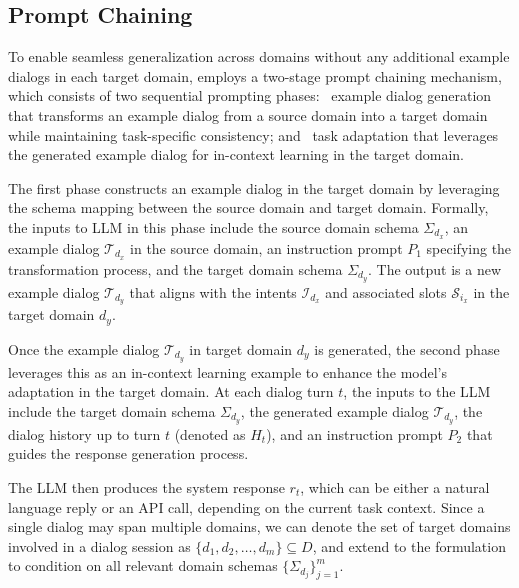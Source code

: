 \subsection{Prompt Chaining} \label{sec:prompt-chain}


To enable seamless generalization across domains without any additional example dialogs in each target domain, {\ours} employs a two-stage prompt chaining mechanism, which consists of two sequential prompting phases: ~example dialog generation that transforms an example dialog from a source domain into a target domain while maintaining task-specific consistency; and ~task adaptation that leverages the generated example dialog for in-context learning in the target domain.

\vspace{5pt}
The first phase constructs an example dialog in the target domain by leveraging the schema mapping between the source domain and target domain. 
Formally, the inputs to LLM in this phase include the source domain schema \(\Sigma_{d_x}\), an example dialog \( \mathcal{T}_{d_x} \) in the source domain, an instruction prompt \( P_1 \) specifying the transformation process, and the target domain schema  \(\Sigma_{d_y}\). The output is a new example dialog \( \mathcal{T}_{d_y} \) that aligns with the intents \(\mathcal{I}_{d_x} \) and associated slots \( \mathcal{S}_{i_x} \) in the target domain \( d_y \). 


\vspace{5pt}
Once the example dialog \( \mathcal{T}_{d_y} \) in target domain \( d_y \) is generated, the second phase leverages this as an in-context learning example to enhance the model's adaptation in the target domain. 
At each dialog turn \( t \), the inputs to the LLM include the target domain schema \( \Sigma_{d_y} \), the generated example dialog \( \mathcal{T}_{d_y} \), the dialog history up to turn \( t \) (denoted as \( H_t \)), and an instruction prompt \( P_2 \) that guides the response generation process.

The LLM then produces the system response \( r_t \), which can be either a natural language reply or an API call, depending on the current task context.
Since a single dialog may span multiple domains, we can denote the set of target domains involved in a dialog session as \( \{d_1, d_2, \dots, d_m\} \subseteq D \), and extend to the formulation to condition on all relevant domain schemas
\( \{\Sigma_{d_j}\}_{j=1}^{m} \).
  
